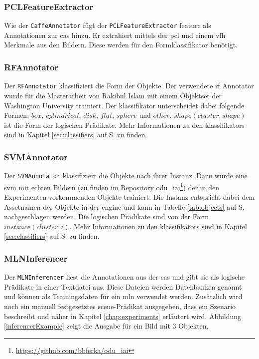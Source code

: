 \subsubsection{PCLFeatureExtractor}
Wie der \texttt{CaffeAnnotator} fügt der \texttt{PCLFeatureExtractor} \gls{feature} als Annotationen zur \gls{cas} hinzu. Er extrahiert mittels der \gls{pcl} und einem \gls{vfh} Merkmale aus den Bildern. Diese werden für den Formklassifikator benötigt.

\subsubsection{RFAnnotator}
Der \texttt{RFAnnotator} klassifiziert die Form der Objekte. Der verwendete \gls{rf} Annotator wurde für die Masterarbeit von Rakibul Islam \cite{rakib} mit einem Objektset der Washington University trainiert. Der \gls{klassifikator} unterscheidet dabei folgende Formen: $box$, $cylindrical$, $disk$, $flat$, $sphere$ und $other$. $shape(cluster, shape)$ ist die Form der logischen Prädikate. Mehr Informationen zu den \glspl{klassifikator} sind in Kapitel \ref{sec:classifiers} auf S. \pageref{sec:classifiers} zu finden.

\subsubsection{SVMAnnotator}
Der \texttt{SVMAnnotator} klassifiziert die Objekte nach ihrer Instanz. Dazu wurde eine \gls{svm} mit echten Bildern (zu finden im Repository odu\_iai\footnote{\url{https://github.com/bbferka/odu\_iai}}) der in den Experimenten vorkommenden Objekte trainiert. Die Instanz entspricht dabei dem Assetnamen der Objekte in der \acrshort{engine} und kann in Tabelle \ref{tab:objects} auf S.\pageref{tab:objects} nachgeschlagen werden. Die logischen Prädikate sind von der Form  $instance(cluster, i)$. Mehr Informationen zu den \glspl{klassifikator} sind in Kapitel \ref{sec:classifiers} auf S. \pageref{sec:classifiers} zu finden.

\subsubsection{MLNInferencer}
\label{sec:mlnInferencer}
Der \texttt{MLNInferencer} liest die Annotationen aus der \gls{cas} und gibt sie als logische Prädikate in einer Textdatei aus. Diese Dateien werden Datenbanken genannt und können als Trainingsdaten für ein \gls{mln} verwendet werden. Zusätzlich wird noch ein manuell festgesetztes scene-Prädikat ausgegeben, dass ein Szenario beschreibt und näher in Kapitel \ref{chap:experiments} erläutert wird. Abbildung \ref{inferencerExample} zeigt die Ausgabe für ein Bild mit 3 Objekten. 

